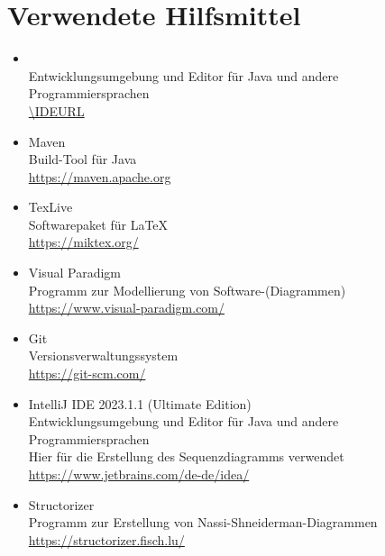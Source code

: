 \chapter{Verwendete Hilfsmittel}\label{ch:verwendete-hilfsmittel}

\begin{itemize}
    \item \IDE \ \IDEVersion \\ Entwicklungsumgebung und Editor für Java und andere Programmiersprachen \\\url{\IDEURL}
    \item Maven\\Build-Tool für Java\\\url{https://maven.apache.org}
    \item TexLive \TexLiveVersion\\Softwarepaket für \LaTeX\\\url{https://miktex.org/}
    \item Visual Paradigm\\Programm zur Modellierung von Software-(Diagrammen) \\\url{https://www.visual-paradigm.com/}
    \item Git\\Versionsverwaltungssystem \\\url{https://git-scm.com/}
    \item IntelliJ IDE 2023.1.1 (Ultimate Edition)\\ Entwicklungsumgebung und Editor für Java und andere Programmiersprachen \\ Hier für die Erstellung des Sequenzdiagramms verwendet \\\url{https://www.jetbrains.com/de-de/idea/}
    \item Structorizer\\Programm zur Erstellung von Nassi-Shneiderman-Diagrammen \\\url{https://structorizer.fisch.lu/}
\end{itemize}